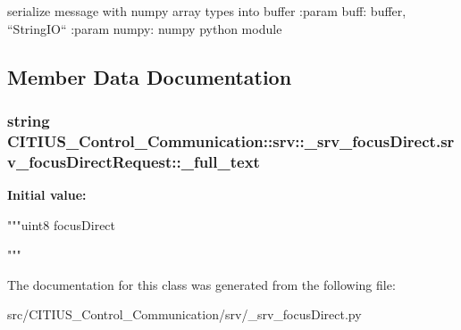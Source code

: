 \begin{DoxyVerb}
serialize message with numpy array types into buffer
:param buff: buffer, ``StringIO``
:param numpy: numpy python module
\end{DoxyVerb}
 

\subsection{\-Member \-Data \-Documentation}
\hypertarget{class_c_i_t_i_u_s___control___communication_1_1srv_1_1__srv__focus_direct_1_1srv__focus_direct_request_a822b90de0c196822484cbc543a465483}{
\subsubsection[{\-\_\-full\-\_\-text}]{\setlength{\rightskip}{0pt plus 5cm}string \-C\-I\-T\-I\-U\-S\-\_\-\-Control\-\_\-\-Communication\-::srv\-::\-\_\-srv\-\_\-focus\-Direct.\-srv\-\_\-focus\-Direct\-Request\-::\-\_\-full\-\_\-text}}\label{class_c_i_t_i_u_s___control___communication_1_1srv_1_1__srv__focus_direct_1_1srv__focus_direct_request_a822b90de0c196822484cbc543a465483}
{\bfseries \-Initial value\-:}
\begin{DoxyCode}
"""uint8 focusDirect

"""
\end{DoxyCode}


\-The documentation for this class was generated from the following file\-:\begin{DoxyCompactItemize}
\item 
src/\-C\-I\-T\-I\-U\-S\-\_\-\-Control\-\_\-\-Communication/srv/\-\_\-srv\-\_\-focus\-Direct.\-py\end{DoxyCompactItemize}

